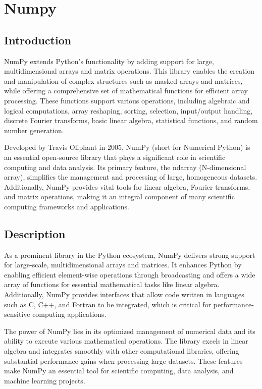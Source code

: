 %
%
%
\chapter{Numpy}

\section{Introduction}

NumPy extends Python's functionality by adding support for large, multidimensional arrays and matrix operations. This library enables the creation and manipulation of complex structures such as masked arrays and matrices, while offering a comprehensive set of mathematical functions for efficient array processing. These functions support various operations, including algebraic and logical computations, array reshaping, sorting, selection, input/output handling, discrete Fourier transforms, basic linear algebra, statistical functions, and random number generation. \cite{Harris:2023}

Developed by Travis Oliphant in 2005, NumPy (short for Numerical Python) is an essential open-source library that plays a significant role in scientific computing and data analysis. Its primary feature, the ndarray (N-dimensional array), simplifies the management and processing of large, homogeneous datasets. Additionally, NumPy provides vital tools for linear algebra, Fourier transforms, and matrix operations, making it an integral component of many scientific computing frameworks and applications. \cite{NumPy:2024}

\section{Description}

As a prominent library in the Python ecosystem, NumPy delivers strong support for large-scale, multidimensional arrays and matrices. It enhances Python by enabling efficient element-wise operations through broadcasting and offers a wide array of functions for essential mathematical tasks like linear algebra. Additionally, NumPy provides interfaces that allow code written in languages such as C, C++, and Fortran to be integrated, which is critical for performance-sensitive computing applications. \cite{Harris:2023}

The power of NumPy lies in its optimized management of numerical data and its ability to execute various mathematical operations. The library excels in linear algebra and integrates smoothly with other computational libraries, offering substantial performance gains when processing large datasets. These features make NumPy an essential tool for scientific computing, data analysis, and machine learning projects.

